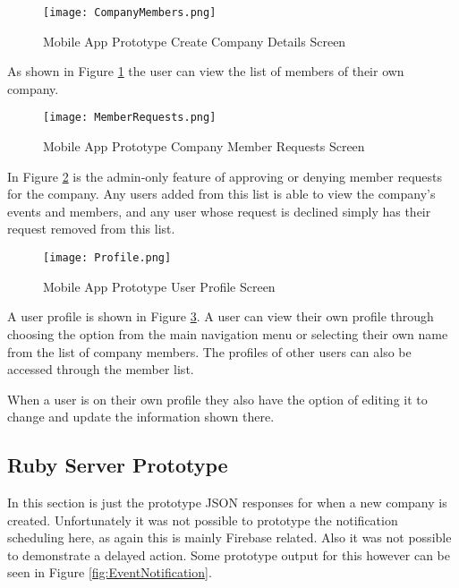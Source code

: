 \clearpage
\begin{figure}[ht]
  \centering
      \texttt{[image: CompanyMembers.png]}
  \caption[Mobile App Prototype Company Details Screen]{Mobile App Prototype Create Company Details Screen}
  \label{fig:CompanyDetails}
\end{figure}

As shown in Figure \ref{fig:CompanyDetails} the user can view the list of members of their own company.

\clearpage
\begin{figure}[ht]
  \centering
      \texttt{[image: MemberRequests.png]}
  \caption[Mobile App Prototype Company Member Requests Screen]{Mobile App Prototype Company Member Requests Screen}
  \label{fig:MemberRequests}
\end{figure}

In Figure \ref{fig:MemberRequests} is the admin-only feature of approving or denying member requests for the company. Any users added from this list is able to view the company's events and members, and any user whose request is declined simply has their request removed from this list.

\clearpage
\begin{figure}[ht]
  \centering
      \texttt{[image: Profile.png]}
  \caption[Mobile App Prototype User Profile Screen]{Mobile App Prototype User Profile Screen}
  \label{fig:UserProfile}
\end{figure}

A user profile is shown in Figure \ref{fig:UserProfile}. A user can view their own profile through choosing the option from the main navigation menu or selecting their own name from the list of company members. The profiles of other users can also be accessed through the member list. 

When a user is on their own profile they also have the option of editing it to change and update the information shown there.

\clearpage %
\subsection{Ruby Server Prototype}

In this section is just the prototype JSON responses for when a new company is created. Unfortunately it was not possible to prototype the notification scheduling here, as again this is mainly Firebase related. Also it was not possible to demonstrate a delayed action. Some prototype output for this however can be seen in Figure \ref{fig:EventNotification}.

